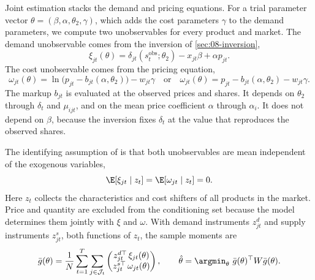 Joint estimation stacks the demand and pricing equations. For a trial parameter vector $\theta = (\beta, \alpha,
\theta_2, \gamma)$, which adds the cost parameters $\gamma$ to the demand parameters, we compute two unobservables
for every product and market. The demand unobservable comes from the
inversion of \cref{sec:08-inversion},
\begin{equation}\label{eq:08-xi-of-theta}
  \xi_{jt}(\theta) = \delta_{jt}(s^{\text{obs}}_t; \theta_2) - x_{jt}\beta + \alpha p_{jt} .
\end{equation}
The cost unobservable comes from the pricing equation,
\begin{equation}\label{eq:08-omega-of-theta}
  \omega_{jt}(\theta) = \ln\big(p_{jt} - b_{jt}(\alpha, \theta_2)\big) - w_{jt}\gamma
  \quad\text{or}\quad
  \omega_{jt}(\theta) = p_{jt} - b_{jt}(\alpha, \theta_2) - w_{jt}\gamma .
\end{equation}
The markup $b_{jt}$ is evaluated at the observed prices and shares. It depends on $\theta_2$ through $\delta_t$ and
$\mu_{ijt}$, and on the mean price coefficient $\alpha$ through $\alpha_i$. It does not depend on $\beta$, because the
inversion fixes $\delta_t$ at the value that reproduces the observed shares.

The identifying assumption of \citet[eq.~4.1]{BerryLevinsohnPakes1995} is that both unobservables are mean independent
of the exogenous variables,
\begin{equation}\label{eq:08-joint-cond}
  \E[\xi_{jt} \mid z_t] = \E[\omega_{jt} \mid z_t] = 0 .
\end{equation}
Here $z_t$ collects the characteristics and cost shifters of all products in the market. Price and quantity are
excluded from the conditioning set because the model determines them jointly with $\xi$ and $\omega$. With demand
instruments $z^d_{jt}$ and supply instruments $z^s_{jt}$, both functions of $z_t$, the sample moments are
\begin{equation}\label{eq:08-joint-moments}
  \bar g(\theta) = \frac{1}{N}\sum_{t=1}^{T}\sum_{j \in \mathcal{J}_t}
  \begin{pmatrix} z^{d\top}_{jt}\,\xi_{jt}(\theta) \\ z^{s\top}_{jt}\,\omega_{jt}(\theta) \end{pmatrix},
  \qquad
  \hat\theta = \argmin_\theta\ \bar g(\theta)^\top W \bar g(\theta) .
\end{equation}

